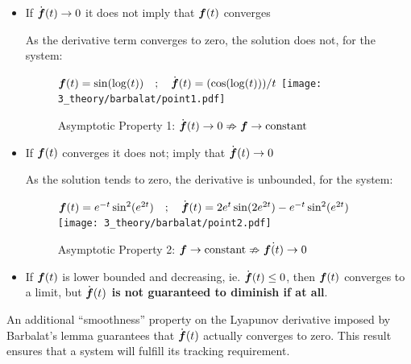 \documentclass[12pt]{ucthesis}
\begin{document}
\begin{itemize}[labelindent=\parindent,leftmargin=\parindent,noitemsep,topsep=0pt,parsep=0pt,partopsep=0pt]%
	\item{If $\dot{\boldsymbol{f}}(t) \rightarrow 0$ it does not imply that $\boldsymbol{f}(t)$ converges
	\begin{eg} As the derivative term converges to zero, the solution does not, for the system:
		\begin{figure}[H]
			\centering%
			$\boldsymbol{f}(t) = \sin(\log(t)) \quad;\quad \dot{\boldsymbol{f}}(t) = (\cos(\log (t))) / {t}$
			\texttt{[image: 3\_theory/barbalat/point1.pdf]}
			\setlength{\abovecaptionskip}{-5pt}
			\caption{Asymptotic Property 1: $\dot{\boldsymbol{f}}(t) \rightarrow 0 \nRightarrow \boldsymbol{f} \rightarrow \text{constant}$}%
			\label{fig: asym_prop1}%
		\end{figure}
		\label{eg: asym_prop1}
	\end{eg}
	}
	\item{If $\boldsymbol{f}(t)$ converges it does not; imply that $\dot{\boldsymbol{f}}(t) \rightarrow 0$
		\begin{eg} As the solution tends to zero, the derivative is unbounded, for the system:
			\begin{figure}[H]
				 \centering
				 $\boldsymbol{f}(t) = e^{-t}\sin^2(e^{2t}) \quad;\quad \dot{\boldsymbol{f}}(t) = 2 e^t \sin(2 e^{2t})-e^{-t} \sin^2(e^{2t})$
				 \texttt{[image: 3\_theory/barbalat/point2.pdf]}%
				 \setlength{\abovecaptionskip}{-5pt}
				 \caption{Asymptotic Property 2: $\boldsymbol{f} \rightarrow \text{constant} \nRightarrow \dot{\boldsymbol{f}(t)} \rightarrow 0 $}%
				 \label{fig: asym_prop2}%
			\end{figure}
			\label{eg: asym_prop2}
		\end{eg}
	}
	\item{If $\boldsymbol{f}(t)$ is lower bounded and decreasing, ie. $\dot{\boldsymbol{f}}(t) \leq 0$, then $\boldsymbol{f}(t)$ converges to a limit, but \textbf{$\dot{\boldsymbol{f}}(t)$ is not guaranteed to diminish if at all}.
	}
	\label{list: asym_func_prop}
\end{itemize}

An additional ``smoothness'' property on the Lyapunov derivative imposed by Barbalat's lemma guarantees that $\dot{\boldsymbol{f}}(t)$ actually converges to zero. This result ensures that a system will fulfill its tracking requirement.
\end{document}
